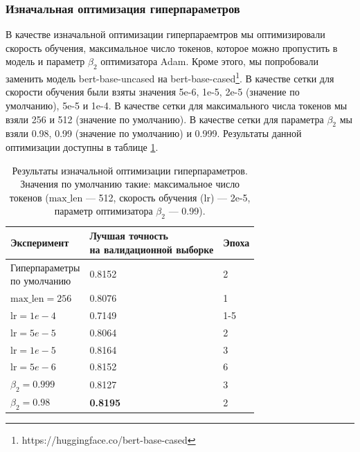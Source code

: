 \documentclass[conference]{IEEEtran}
\begin{document}
\subsubsection{Изначальная оптимизация гиперпараметров}
В качестве изначальной оптимизации гиперпараемтров мы оптимизировали скорость обучения, максимальное число токенов, которое можно пропустить в модель и параметр $\beta_2$ оптимизатора Adam. Кроме этого, мы попробовали заменить модель bert-base-uncased на bert-base-cased\footnote{https://huggingface.co/bert-base-cased}. В качестве сетки для скорости обучения были взяты значения 5e-6, 1e-5, 2e-5 (значение по умолчанию), 5e-5 и 1e-4. В качестве сетки для максимального числа токенов мы взяли 256 и 512 (значение по умолчанию). В качестве сетки для параметра $\beta_2$ мы взяли 0.98, 0.99 (значение по умолчанию) и 0.999. Результаты данной оптимизации доступны в таблице \ref{tab:initial-hyperparameters-optimization-results}.
\begin{table}[h!]
    \begin{center}
        \begin{tabular}{|l|l|l|}
            \hline
            Эксперимент & \thead{Лучшая точность \\ на валидационной выборке} & Эпоха \\ \hline
            \makecell{Гиперпараметры \\ по умолчанию} & 0.8152 & 2 \\ \hline
            $\text{max\_len} = 256$ & 0.8076 & 1 \\ \hline
            $\text{lr} = 1e-4$ & 0.7149 & 1-5 \\ \hline
            $\text{lr} = 5e-5$ & 0.8064 & 2 \\ \hline
            $\text{lr} = 1e-5$ & 0.8164 & 3 \\ \hline
            $\text{lr} = 5e-6$ & 0.8152 & 6 \\ \hline
            $\beta_2 = 0.999$ & 0.8127 & 3 \\ \hline
            $\beta_2 = 0.98$ & \textbf{0.8195} & 2 \\ \hline
        \end{tabular}
        \caption{Результаты изначальной оптимизации гиперпараметров. Значения по умолчанию такие: максимальное число токенов ($\text{max\_len}$ --- 512, скорость обучения ($\text{lr}$) --- 2e-5, параметр оптимизатора $\beta_2$ --- 0.99).}
        \label{tab:initial-hyperparameters-optimization-results}    
    \end{center}
\end{table}
\end{document}
